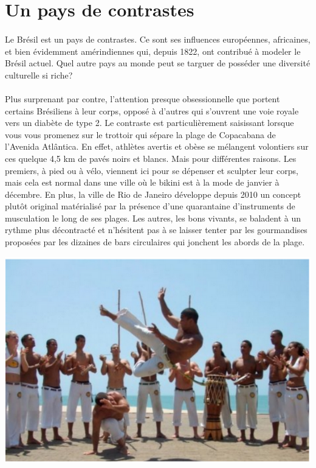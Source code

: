 \section{Un pays de contrastes}

\paragraph{} Le Brésil est un pays de contrastes. Ce sont ses influences
européennes, africaines, et bien évidemment amérindiennes qui, depuis 1822, ont
contribué à modeler le Brésil actuel. Quel autre pays au monde peut se targuer
de posséder une diversité culturelle si riche?

\paragraph{} Plus surprenant par contre, l'attention presque obsessionnelle que
portent certains Brésiliens à leur corps, opposé à d'autres qui s'ouvrent une
voie royale vers un diabète de type 2. Le contraste est particulièrement
saisissant lorsque vous vous promenez sur le trottoir qui sépare la plage de
Copacabana de l'Avenida Atlântica. En effet, athlètes avertis et obèse se
mélangent volontiers sur ces quelque 4,5 km de pavés noirs et blancs. Mais pour
différentes raisons. Les premiers, à pied ou à vélo, viennent ici pour se
dépenser et sculpter leur corps, mais cela est normal dans une ville où le
bikini est à la mode de janvier à décembre. En plus, la ville de Rio de Janeiro
développe depuis 2010 un concept plutôt original matérialisé par la présence
d'une quarantaine d'instruments de musculation le long de ses plages. Les
autres, les bons vivants, se baladent à un rythme plus décontracté et
n'hésitent pas à se laisser tenter par les gourmandises proposées par les
dizaines de bars circulaires qui jonchent les abords de la plage.

\begin{center}
\includegraphics[scale=0.5]{bresil2.png}
\end{center}

